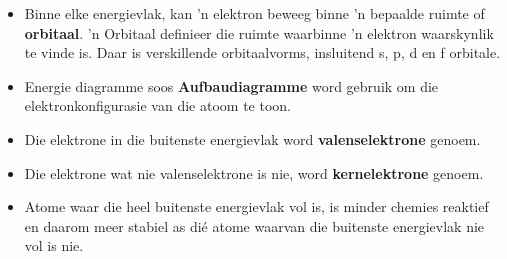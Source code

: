 \begin{itemize}[noitemsep]
\item Binne elke energievlak, kan 'n elektron beweeg binne 'n bepaalde ruimte of \textbf{orbitaal}. 'n Orbitaal definieer die ruimte waarbinne 'n elektron waarskynlik te vinde is. Daar is verskillende orbitaalvorms, insluitend s, p, d en f orbitale.
\item Energie diagramme soos \textbf{Aufbaudiagramme} word gebruik om die elektronkonfigurasie van die atoom te toon.
\item Die elektrone in die buitenste energievlak word \textbf{valenselektrone} genoem.
\item Die elektrone wat nie valenselektrone is nie, word \textbf{kernelektrone} genoem.
\item Atome waar die heel buitenste energievlak vol is, is minder chemies reaktief en daarom meer stabiel as dié atome waarvan die buitenste energievlak nie vol is nie.
\end{itemize}

     
            

